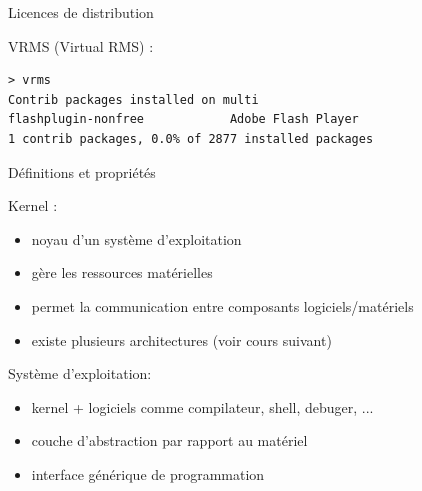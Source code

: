 \documentclass[12pt,t]{beamer}
\newcommand{\bi}{\begin{itemize}}
\newcommand{\ei}{\end{itemize}}
\newcommand{\incnote}[1]{\note{\ExecuteMetaData[notes.tex]{#1}}}
\begin{document}
\begin{frame}[fragile]{Licences de distribution}
    \vspace{20pt}

    VRMS (Virtual RMS) :
    \vspace{15pt}
    \begin{lstlisting}
> vrms
Contrib packages installed on multi
flashplugin-nonfree            Adobe Flash Player
1 contrib packages, 0.0% of 2877 installed packages
    \end{lstlisting}

\end{frame}

\begin{frame}{Définitions et propriétés}
    \vspace{10pt}

    Kernel :
    \bi
    \item noyau d'un système d'exploitation
    \item gère les ressources matérielles
    \item permet la communication entre composants logiciels/matériels
    \item existe plusieurs architectures (voir cours suivant)
    \ei

    \vspace{10pt}
    Système d'exploitation:
    \bi
    \item kernel + logiciels comme compilateur, shell, debuger, ...
    \item couche d'abstraction par rapport au matériel
    \item interface générique de programmation
    \ei

    \incnote{def1}
\end{frame}
\end{document}
